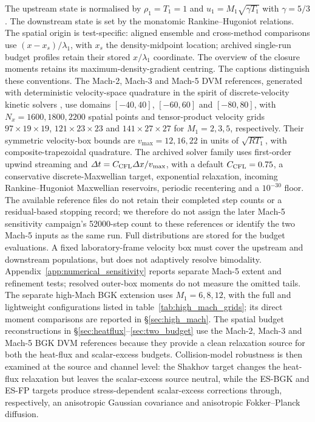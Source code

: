 \documentclass[lineno,paper]{JFM-FLM_Au}
\newenvironment{revision}{\begingroup\colorlet{shadecolor}{revisionyellow}\begin{shaded}}{\end{shaded}\endgroup}
\newenvironment{revision}{}{}
\begin{document}
\begin{revision}
The upstream state is normalised by $\rho_1=T_1=1$ and $u_1=M_1\sqrt{\gamma T_1}$ with $\gamma=5/3$.  The downstream state is set by the monatomic Rankine--Hugoniot relations.  The spatial origin is test-specific: aligned ensemble and cross-method comparisons use $(x-x_s)/\lambda_1$, with $x_s$ the density-midpoint location; archived single-run budget profiles retain their stored $x/\lambda_1$ coordinate. The overview of the closure moments retains its maximum-density-gradient centring. The captions distinguish these conventions.  The Mach-2, Mach-3 and Mach-5 DVM references, generated with deterministic velocity-space quadrature in the spirit of discrete-velocity kinetic solvers \citep{Mieussens2000,FilbetJin2010,DimarcoPareschi2014}, use domains $[-40,40]$, $[-60,60]$ and $[-80,80]$, with $N_x=1600,1800,2200$ spatial points and tensor-product velocity grids $97\times19\times19$, $121\times23\times23$ and $141\times27\times27$ for $M_1=2,3,5$, respectively. Their symmetric velocity-box bounds are $v_{\max}=12,16,22$ in units of $\sqrt{RT_1}$, with composite-trapezoidal quadrature. The archived solver family uses first-order upwind streaming and $\Delta t=C_{\rm CFL}\Delta x/v_{\max}$, with a default $C_{\rm CFL}=0.75$, a conservative discrete-Maxwellian target, exponential relaxation, incoming Rankine--Hugoniot Maxwellian reservoirs, periodic recentering and a $10^{-30}$ floor. The available reference files do not retain their completed step counts or a residual-based stopping record; we therefore do not assign the later Mach-5 sensitivity campaign's 52000-step count to these references or identify the two Mach-5 inputs as the same run. Full distributions are stored for the budget evaluations. A fixed laboratory-frame velocity box must cover the upstream and downstream populations, but does not adaptively resolve bimodality. Appendix~\ref{app:numerical_sensitivity} reports separate Mach-5 extent and refinement tests; resolved outer-box moments do not measure the omitted tails. The separate high-Mach BGK extension uses $M_1=6,8,12$, with the full and lightweight configurations listed in table~\ref{tab:high_mach_grids}; its direct moment comparisons are reported in \S\ref{sec:high_mach}.  The spatial budget reconstructions in \S\ref{sec:heatflux}--\ref{sec:two_budget} use the Mach-2, Mach-3 and Mach-5 BGK DVM references because they provide a clean relaxation source for both the heat-flux and scalar-excess budgets.  Collision-model robustness is then examined at the source and channel level: the Shakhov target changes the heat-flux relaxation but leaves the scalar-excess source neutral, while the ES-BGK and ES-FP targets produce stress-dependent scalar-excess corrections through, respectively, an anisotropic Gaussian covariance and anisotropic Fokker--Planck diffusion.
\end{revision}
\end{document}
